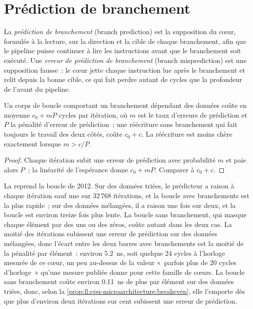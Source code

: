 \section{Prédiction de branchement}

\begin{definition}\label{def:ll:cpu-microarchitecture:branch}
La \emph{prédiction de branchement} (branch prediction) est la supposition du cœur, formulée à la lecture, sur la direction et la cible de
chaque branchement, afin que le pipeline puisse continuer à lire les instructions avant que le branchement soit exécuté. Une \emph{erreur de
prédiction de branchement} (branch misprediction) est une supposition fausse~: le cœur jette chaque instruction lue après le
branchement et relit depuis la bonne cible, ce qui fait perdre autant de cycles que la profondeur de l'avant du pipeline.
\end{definition}

\begin{proposition}\label{prop:ll:cpu-microarchitecture:breakeven}
Un corps de boucle comportant un branchement dépendant des données coûte en moyenne $c_0 + mP$ cycles par itération, où $m$ est le
taux d'erreurs de prédiction et $P$ la pénalité d'erreur de prédiction~; une réécriture sans branchement qui fait toujours le travail des deux côtés,
coûte $c_0 + c$. La réécriture est moins chère exactement lorsque $m > c/P$.
\end{proposition}

\begin{proof}
Chaque itération subit une erreur de prédiction avec probabilité $m$ et paie alors $P$~; la linéarité de l'espérance donne $c_0 + mP$. Comparer
à $c_0 + c$.
\end{proof}

La  reprend la boucle de 2012. Sur des données triées, le prédicteur a raison à chaque itération sauf
une sur 32\,768 itérations, et la boucle avec branchements est la plus rapide~; sur des données mélangées, il a raison une fois sur deux, et la boucle
est environ treize fois plus lente. La boucle sans branchement, qui masque chaque élément par des uns ou des zéros, coûte autant
dans les deux cas. La moitié des itérations subissent une erreur de prédiction sur des données mélangées, donc l'écart entre les deux barres avec branchements est la
moitié de la pénalité par élément~: environ \qty{5.2}{\nano\second}, soit quelque 24 cycles à l'horloge mesurée de ce cœur, un peu au-dessus de la
valeur «~parfois plus de 20 cycles d'horloge~» qu'une mesure publiée donne pour cette famille de cœurs. La boucle sans branchement
coûte environ \qty{0.11}{\nano\second} de plus par élément sur des données triées, donc, selon la
\cref{prop:ll:cpu-microarchitecture:breakeven}, elle l'emporte dès que plus d'environ deux itérations sur cent
subissent une erreur de prédiction.


